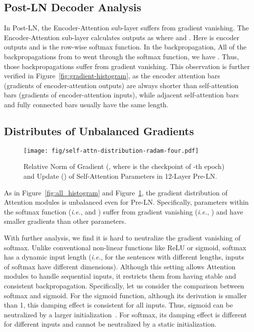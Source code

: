 \documentclass[11pt,a4paper]{article}
\newcommand{\ie}{\textit{i.e.}}
\begin{document}
\subsection{Post-LN Decoder Analysis}
\label{subsec:postln_decoder_analysis}
In Post-LN, the Encoder-Attention sub-layer suffers from gradient vanishing. 
The Encoder-Attention sub-layer calculates outputs as 
 where  and . 
Here  is encoder outputs and  is the row-wise softmax function. 
In the backpropagation, 
All of the backpropagations from  to  went through the softmax function, we have . 
Thus, those backpropagations suffer from gradient vanishing. 
This observation is further verified in Figure~\ref{fig:gradient-histogram}, as the encoder attention bars (gradients of encoder-attention outputs) are always shorter than self-attention bars (gradients of encoder-attention inputs), while adjacent self-attention bars and fully connected bars usually have the same length. 


\subsection{Distributes of Unbalanced Gradients}
\label{subsec:attention_gradients}

\begin{figure}[t]
\centering
\texttt{[image: fig/self-attn-distribution-radam-four.pdf]}
\caption{
Relative Norm of Gradient (, where  is the checkpoint of -th epoch) and Update () of Self-Attention Parameters in 12-Layer Pre-LN.
}
\label{fig:update-with-gradient-four}
\end{figure}

As in Figure~\ref{fig:all_histogram} and Figure~\ref{fig:update-with-gradient-four}, the gradient distribution of Attention modules is unbalanced even for Pre-LN. 
Specifically, parameters within the softmax function (\ie,  and ) suffer from gradient vanishing (\ie, ) and have smaller gradients than other parameters.

With further analysis, we find it is hard to neutralize the gradient vanishing of softmax. 
Unlike conventional non-linear functions like ReLU or sigmoid, softmax has a dynamic input length (\ie, for the sentences with different lengths, inputs of softmax have different dimensions). 
Although this setting allows Attention modules to handle sequential inputs, it restricts them from having stable and consistent backpropagation. 
Specifically, let us consider the comparison between softmax and sigmoid. 
For the sigmoid function, although its derivation is smaller than 1, this damping effect is consistent for all inputs. 
Thus, sigmoid can be neutralized by a larger initialization~\cite{Glorot2010UnderstandingTD}. 
For softmax, its damping effect is different for different inputs and cannot be neutralized by a static initialization. 
\end{document}
